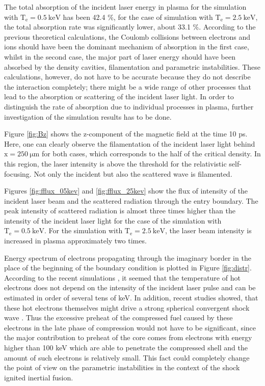 The total absorption of the incident laser energy in plasma for the simulation with $ \mathrm{T_e} = 0.5 \: \mathrm{keV} $ has been 42.4 \%, for the case of simulation with $ \mathrm{T_e} = 2.5 \: \mathrm{keV} $, the total absorption rate was significantly lower, about 33.1 \%. According to the previous theoretical calculations, the Coulomb collisions between electrons and ions should have been the dominant mechanism of absorption in the first case, whilst in the second case, the major part of laser energy should have been absorbed by the density cavities, filamentation and parametric instabilities. These calculations, however, do not have to be accurate because they do not describe the interaction completely; there might be a wide range of other processes that lead to the absorption or scattering of the incident laser light. In order to distinguish the rate of absorption due to individual processes in plasma, further investigation of the simulation results has to be done.

Figure \ref{fig:Bz} shows the z-component of the magnetic field at the time 10 ps. Here, one can clearly observe the filamentation of the incident laser light behind $ \mathrm{x} = 250 \: \mathrm{\mu m} $ for both cases, which corresponds to the half of the critical density. In this region, the laser intensity is above the threshold for the relativistic self-focusing. Not only the incident but also the scattered wave is filamented.

Figures \ref{fig:fflux_05kev} and \ref{fig:fflux_25kev} show the flux of intensity of the incident laser beam and the scattered radiation through the entry boundary. The peak intensity of scattered radiation is almost three times higher than the intensity of the incident laser light for the case of the simulation with $ \mathrm{T_e} = 0.5 \: \mathrm{keV} $. For the simulation with  $ \mathrm{T_e} = 2.5 \: \mathrm{keV} $, the laser beam intensity is increased in plasma approximately two times. 

Energy spectrum of electrons propagating through the imaginary border in the place of the beginning of the boundary condition is plotted in Figure \ref{fig:distr}. According to the recent simulations \cite{klimo2}, it seemed that the temperature of hot electrons does not depend on the intensity of the incident laser pulse and can be estimated in order of several tens of keV. In addition, recent studies showed, that these hot electrons themselves might drive a strong spherical convergent shock wave \cite{tikhonchuk}. Thus the excessive preheat of the compressed fuel caused by these electrons in the late phase of compression would not have to be significant, since the major contribution to preheat of the core comes from electrons with energy higher than 100 keV which are able to penetrate the compressed shell and the amount of such electrons is relatively small. This fact could completely change the point of view on the parametric instabilities in the context of the shock ignited inertial fusion.

